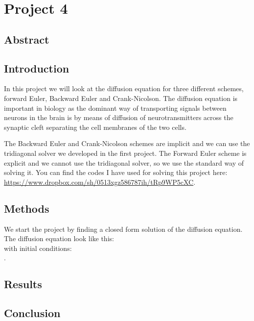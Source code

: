 \documentclass[a4wide,12pt]{article}
\begin{document}
\section*{Project 4}
\subsection*{Abstract}

\subsection*{Introduction}
In this project we will look at the diffusion equation for three different schemes, forward Euler, Backward Euler and Crank-Nicolson. The diffusion equation is important in biology as the dominant way of transporting signals between neurons in the brain is by means of diffusion of neurotransmitters across the synaptic cleft separating the cell membranes of the two cells.

The Backward Euler and Crank-Nicolson schemes are implicit and we can use the tridiagonal solver we developed in the first project. The Forward Euler scheme is explicit and we cannot use the tridiagonal solver, so we use the standard way of solving it. You can find the codes I have used for solving this project here: \url{https://www.dropbox.com/sh/0513xgz586787ih/tRp9WP5cXC}. 

\subsection*{Methods}
We start the project by finding a closed form solution of the diffusion equation. The diffusion equation look like this:
\[

\]
with initial conditions:
\[

\]. 
\subsection*{Results}
\subsection*{Conclusion}
\end{document}
